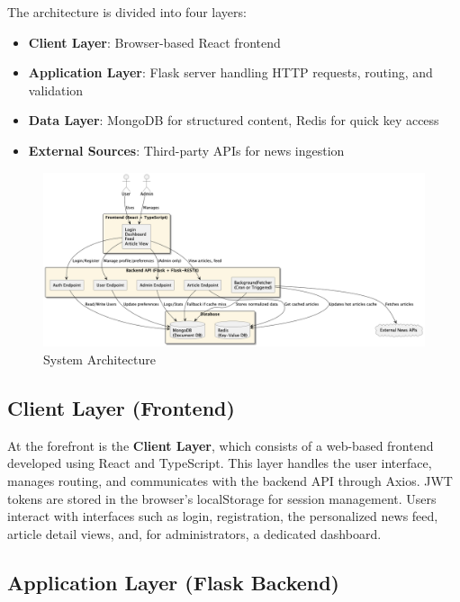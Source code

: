 The architecture is divided into four layers:
\begin{itemize}
    \item \textbf{Client Layer}: Browser-based React frontend
    \item \textbf{Application Layer}: Flask server handling HTTP requests, routing, and validation
    \item \textbf{Data Layer}: MongoDB for structured content, Redis for quick key access
    \item \textbf{External Sources}: Third-party APIs for news ingestion
\end{itemize}


\begin{figure}[!h]
    \centering
    \includegraphics[width=1.1\textwidth]{chapters/chapter_03/system-architecture-smart-news-aggregator}
    \caption{System Architecture}
    \label{fig:system-architecture-diagram}
\end{figure}

\subsection{Client Layer (Frontend)}\label{subsec:client-layer-frontend}

At the forefront is the \textbf{Client Layer}, which consists of a web-based frontend developed using React and TypeScript.
This layer handles the user interface, manages routing, and communicates with the backend API through Axios.
JWT tokens are stored in the browser’s localStorage for session management.
Users interact with interfaces such as login, registration, the personalized news feed, article detail views, and, for administrators, a dedicated dashboard.

\subsection{Application Layer (Flask Backend)}\label{subsec:application-layer-flask-backend}

